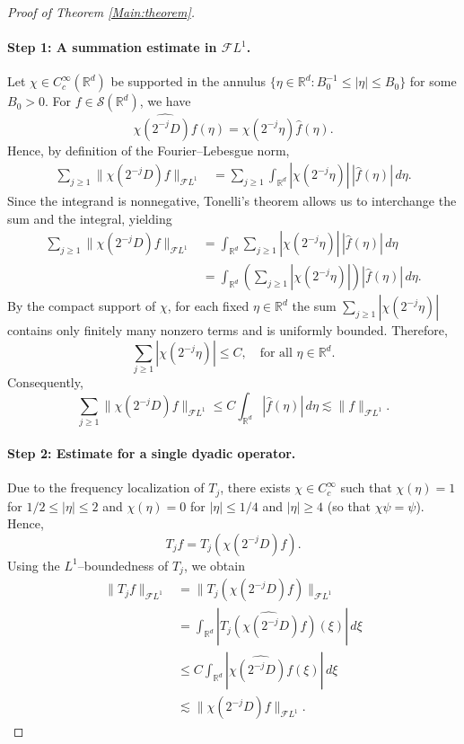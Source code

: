\documentclass[12pt, reqno]{amsart}
\theoremstyle{definition}
\theoremstyle{remark}
\numberwithin{equation}{section}
\begin{document}
\begin{proof}[Proof of Theorem \ref{Main:theorem}]
\paragraph{Step 1: A summation estimate in $\mathcal{F}L^1$.}
Let $\chi\in C_c^\infty(\mathbb{R}^d)$ be supported in the annulus
$\{\eta\in\mathbb{R}^d : B_0^{-1}\le |\eta|\le B_0\}$ for some $B_0>0$.
For $f\in\mathcal{S}(\mathbb{R}^d)$, we have
\[
\widehat{\chi(2^{-j}D)f}(\eta)
=
\chi(2^{-j}\eta)\widehat f(\eta).
\]
Hence, by definition of the Fourier--Lebesgue norm,
\begin{align*}
\sum_{j\ge1} \|\chi(2^{-j}D)f\|_{\mathcal{F}L^1}
&=
\sum_{j\ge1}
\int_{\mathbb{R}^d}
|\chi(2^{-j}\eta)|\,|\widehat f(\eta)|\,d\eta.
\end{align*}
Since the integrand is nonnegative, Tonelli's theorem allows us to interchange
the sum and the integral, yielding
\begin{align*}
\sum_{j\ge1} \|\chi(2^{-j}D)f\|_{\mathcal{F}L^1}
&=
\int_{\mathbb{R}^d}
\sum_{j\ge1}
|\chi(2^{-j}\eta)|\,|\widehat f(\eta)|
\,d\eta \\
&=
\int_{\mathbb{R}^d}
\left(
\sum_{j\ge1} |\chi(2^{-j}\eta)|
\right)
|\widehat f(\eta)|\,d\eta.
\end{align*}
By the compact support of $\chi$, for each fixed $\eta\in\mathbb{R}^d$ the sum
$\sum_{j\ge1} |\chi(2^{-j}\eta)|$ contains only finitely many nonzero terms and
is uniformly bounded. Therefore,
\[
\sum_{j\ge1} |\chi(2^{-j}\eta)| \le C,
\quad \text{for all } \eta\in\mathbb{R}^d.
\]
Consequently,
\[
\sum_{j\ge1} \|\chi(2^{-j}D)f\|_{\mathcal{F}L^1}
\le
C
\int_{\mathbb{R}^d} |\widehat f(\eta)|\,d\eta
\lesssim\|f\|_{\mathcal{F}L^1}.
\]

\medskip

\paragraph{Step 2: Estimate for a single dyadic operator.}
Due to the frequency localization of $T_j$, there exists $\chi\in C_c^\infty$
such that  $\chi(\eta)=1$ for $1/2\le |\eta|\le 2$ and $\chi(\eta)=0$ for $|\eta|\le 1/4$ and $|\eta|\ge 4$ (so that $\chi \psi=\psi$). 
Hence,
\[
T_j f = T_j(\chi(2^{-j}D)f).
\]
Using the $L^1$--boundedness of $T_j$, we obtain
\begin{align*}
\|T_j f\|_{\mathcal{F}L^1}
&=
\|T_j(\chi(2^{-j}D)f)\|_{\mathcal{F}L^1} \\
&=
\int_{\mathbb{R}^d}
\left|
\widehat{T_j(\chi(2^{-j}D)f)}(\xi)
\right|
\,d\xi \\
&\le
C
\int_{\mathbb{R}^d}
\left|
\widehat{\chi(2^{-j}D)f}(\xi)
\right|
\,d\xi \\
&\lesssim
\|\chi(2^{-j}D)f\|_{\mathcal{F}L^1}.
\end{align*}

\end{proof}
\end{document}
